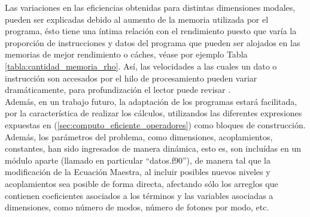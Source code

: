 \qquad Las variaciones en las eficiencias obtenidas para distintas dimensiones modales, pueden ser explicadas debido al aumento de la memoria utilizada por el programa, \'esto tiene una \'intima relaci\'on con el rendimiento puesto que var\'ia la proporci\'on de instrucciones y datos del programa que pueden ser alojados en las memorias de mejor rendimiento o c\'aches, v\'ease por ejemplo Tabla \ref{tabla:cantidad_memoria_rho}. As\'i, las velocidades a las cuales un dato o instrucci\'on son accesados por el hilo de procesamiento pueden variar dram\'aticamente, para profundizaci\'on el lector puede revisar \cite{arquitectura_pcs}.\\

\qquad Adem\'as, en un trabajo futuro, la adaptaci\'on de los programas estar\'a facilitada, por la caracter\'istica de realizar los c\'alculos, utilizandos las diferentes expresiones expuestas en (\ref{sec:computo_eficiente_operadores}) como bloques de construcci\'on. Adem\'as, los par\'ametros del problema, como dimensiones, acoplamientos, constantes, han sido ingresados de manera din\'amica, esto es, son inclu\'idas en un m\'odulo aparte (llamado en particular ``datos.f90''), de manera tal que la modificaci\'on de la Ecuaci\'on Maestra, al incluir posibles nuevos niveles y acoplamientos sea posible de forma directa, afectando s\'olo los arreglos que contienen coeficientes asociados a los t\'erminos y las variables asociadas a dimensiones, como n\'umero de modos, n\'umero de fotones por modo, etc.